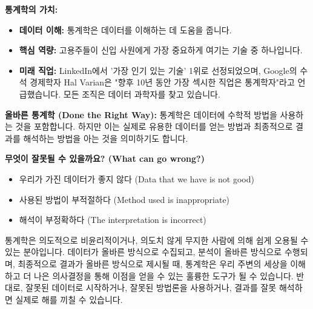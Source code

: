 \documentclass[11pt,a4paper]{book}
\theoremstyle{definition}
\begin{document}
\begin{summarybox}
\textbf{통계학의 가치:}
\begin{itemize}
    \item \textbf{데이터 이해:} 통계학은 데이터를 이해하는 데 도움을 줍니다.
    \item \textbf{핵심 역량:} 고용주들이 신입 사원에게 가장 중요하게 여기는 기술 중 하나입니다.
    \item \textbf{미래 직업:} LinkedIn에서 '가장 인기 있는 기술' 1위로 선정되었으며, Google의 수석 경제학자 Hal Varian은 "향후 10년 동안 가장 섹시한 직업은 통계학자"라고 언급했습니다. 모든 조직은 데이터 과학자를 찾고 있습니다.
\end{itemize}
\end{summarybox}

\begin{tcolorbox}[title={그렇다면 통계학이란 무엇일까요? (So What is Statistics?)}]
\textbf{올바른 통계학 (Done the Right Way):}
통계학은 데이터에 수학적 방법을 사용하는 것을 포함합니다. 하지만 이는 실제로 유용한 데이터를 얻는 방법과 최종적으로 결과를 해석하는 방법을 아는 것을 의미하기도 합니다.

\textbf{무엇이 잘못될 수 있을까요? (What can go wrong?)}
\begin{itemize}
    \item 우리가 가진 데이터가 좋지 않다 (Data that we have is not good)
    \item 사용된 방법이 부적절하다 (Method used is inappropriate)
    \item 해석이 부정확하다 (The interpretation is incorrect)
\end{itemize}
통계학은 의도적으로 비윤리적이거나, 의도치 않게 무지한 사람에 의해 쉽게 오용될 수 있는 분야입니다. 데이터가 올바른 방식으로 수집되고, 분석이 올바른 방식으로 수행되며, 최종적으로 결과가 올바른 방식으로 제시될 때, 통계학은 우리 주변의 세상을 이해하고 더 나은 의사결정을 통해 이점을 얻을 수 있는 훌륭한 도구가 될 수 있습니다. 반대로, 잘못된 데이터로 시작하거나, 잘못된 방법론을 사용하거나, 결과를 잘못 해석하면 실제로 해를 끼칠 수 있습니다.
\end{tcolorbox}
\end{document}

